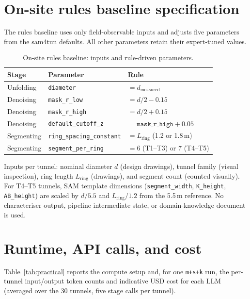 \section{On-site rules baseline specification}\label{app:rules}

The rules baseline uses only field-observable inputs and adjusts five parameters from the sam4tun defaults. All other parameters retain their expert-tuned values.

\begin{table}[ht]
\caption{On-site rules baseline: inputs and rule-driven parameters.}\label{tab:rules-spec}
\begin{tabular*}{\tblwidth}{@{} l l l @{}}
\toprule
Stage & Parameter & Rule \\
\midrule
Unfolding & \texttt{diameter} & $= d_{\mathrm{measured}}$ \\
Denoising & \texttt{mask\_r\_low} & $= d/2 - 0.15$ \\
Denoising & \texttt{mask\_r\_high} & $= d/2 + 0.15$ \\
Denoising & \texttt{default\_cutoff\_z} & $= \texttt{mask\_r\_high} + 0.05$ \\
Segmenting & \texttt{ring\_spacing\_constant} & $= L_{\mathrm{ring}}$ (1.2 or 1.8\,m) \\
Segmenting & \texttt{segment\_per\_ring} & $= 6$ (T1--T3) or $7$ (T4--T5) \\
\bottomrule
\end{tabular*}
\end{table}

\noindent Inputs per tunnel: nominal diameter $d$ (design drawings), tunnel family (visual inspection), ring length $L_{\mathrm{ring}}$ (drawings), and segment count (counted visually). For T4--T5 tunnels, SAM template dimensions (\texttt{segment\_width}, \texttt{K\_height}, \texttt{AB\_height}) are scaled by $d/5.5$ and $L_\mathrm{ring}/1.2$ from the 5.5\,m reference. No characteriser output, pipeline intermediate state, or domain-knowledge document is used.

\section{Runtime, API calls, and cost}\label{app:practical}
Table~\ref{tab:practical} reports the compute setup and, for one \texttt{m+s+k} run, the per-tunnel input/output token counts and indicative USD cost for each LLM (averaged over the 30 tunnels, five stage calls per tunnel).

